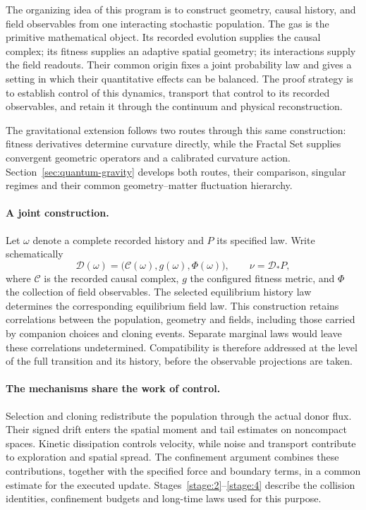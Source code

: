\documentclass[11pt,a4paper]{article}
\begin{document}
The organizing idea of this program is to construct geometry, causal history,
and field observables from one interacting stochastic population. The gas is
the primitive mathematical object. Its recorded evolution supplies the causal
complex; its fitness supplies an adaptive spatial geometry; its interactions
supply the field readouts. Their common origin fixes a joint probability law
and gives a setting in which their quantitative effects can be balanced.
The proof strategy is to establish control of this dynamics, transport that
control to its recorded observables, and retain it through the continuum and
physical reconstruction.

The gravitational extension follows two routes through this same construction:
fitness derivatives determine curvature directly, while the Fractal Set
supplies convergent geometric operators and a calibrated curvature action.
Section~\ref{sec:quantum-gravity} develops both routes, their comparison,
singular regimes and their common geometry--matter fluctuation hierarchy.

\paragraph{A joint construction.}
Let \(\omega\) denote a complete recorded history and \(P\) its specified
law. Write schematically
\[
\mathscr D(\omega)
 =\bigl(\mathcal C(\omega),g(\omega),\Phi(\omega)\bigr),
\qquad \nu=\mathscr D_*P,
\]
where \(\mathcal C\) is the recorded causal complex, \(g\) the configured
fitness metric, and \(\Phi\) the collection of field observables. The selected
equilibrium history law determines the corresponding equilibrium field law.
This construction retains correlations between the population, geometry and
fields, including those carried by companion choices and cloning events.
Separate marginal laws would leave these correlations undetermined.
Compatibility is therefore addressed at the level of the full transition
and its history, before the observable projections are taken.

\paragraph{The mechanisms share the work of control.}
Selection and cloning redistribute the population through the actual donor
flux. Their signed drift enters the spatial moment and tail estimates on
noncompact spaces. Kinetic dissipation controls velocity, while noise and
transport contribute to exploration and spatial spread. The confinement
argument combines these contributions, together with the specified force
and boundary terms, in a common estimate for the executed update.
Stages~\ref{stage:2}--\ref{stage:4} describe the collision identities,
confinement budgets and long-time laws used for this purpose.
\end{document}
